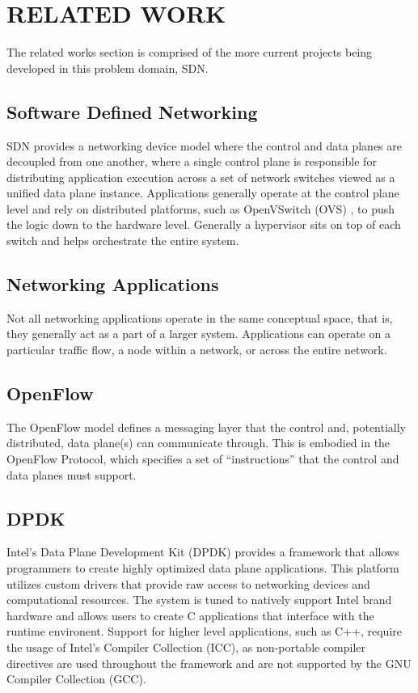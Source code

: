 \chapter{RELATED WORK}
\label{related}
The related works section is comprised of the more current projects being
developed in this problem domain, SDN.

\section{Software Defined Networking}
\label{related:sdn}
SDN provides a networking device model where the control and data planes are
decoupled from one another, where a single control plane is responsible for
distributing application execution across a set of network switches viewed as
a unified data plane instance. Applications generally operate at the control
plane level and rely on distributed platforms, such as OpenVSwitch (OVS)
\cite{ovs}, to push the logic down to the hardware level. Generally a hypervisor
sits on top of each switch and helps orchestrate the entire system.


\section{Networking Applications}
\label{related:apps}
Not all networking applications operate in the same conceptual space, that is,
they generally act as a part of a larger system. Applications can operate on a
particular traffic flow, a node within a network, or across the entire network.

\section{OpenFlow}
\label{related:of}
The OpenFlow \cite{openflow} model defines a messaging layer that the control
and, potentially distributed, data plane(s) can communicate through. This is
embodied in the OpenFlow Protocol, which specifies a set of ``instructions''
that the control and data planes must support.

\section{DPDK}
\label{related:dpdk}
Intel's Data Plane Development Kit (DPDK) \cite{dpdk} provides a framework that
allows programmers to create highly optimized data plane applications. This
platform utilizes custom drivers that provide raw access to networking devices
and computational resources. The system is tuned to natively support Intel
brand hardware and allows users to create C applications that interface with
the runtime environent. Support for higher level applications, such as C++,
require the usage of Intel's Compiler Collection (ICC), as non-portable compiler
directives are used throughout the framework and are not supported by the GNU
Compiler Collection (GCC).

